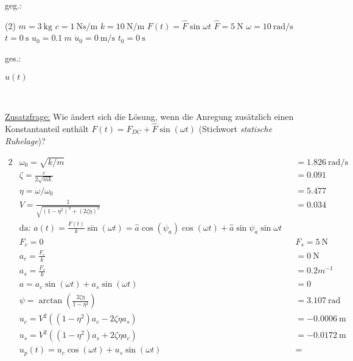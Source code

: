     


    \begin{minipage}[t]{.49\linewidth}
        geg.:
        \begin{tasks} (2)
           \task[] $m = \SI{3}{\kilo\gram}$
           \task[] $c = \SI{1}{\newton\second\per\meter}$
           \task[] $k = \SI{10}{\newton\per\meter}$
            \task[] $F(t) = \hat{F} \sin{\omega t}$
           \task[] $\hat{F} = \SI{5}{\newton}$
           \task[] $\omega = \SI{10}{\radian\per\second}$
           \task[] $t=\SI{0}{\second}$
           \task[] $u_0 = \SI{0.1}{m}$
           \task[] $\dot{u}_0 = \SI{0}{\meter\per\second}$
           \task[] $t_0 = \SI{0}{\second}$
        \end{tasks}
        \end{minipage}
        \begin{minipage}[t]{.49\linewidth}
        ges.:
        \begin{tasks}
            \task[] $u(t)$
        \end{tasks}
    \end{minipage}\\
    \vspace{1cm}

    \underline{Zusatzfrage:} Wie ändert sich die Lösung, wenn die Anregung zusätzlich einen Konstantanteil enthält $F(t) = F_{DC} +\hat{F} \sin{(\omega t)}$ (Stichwort \textit{statische Ruhelage})?

    \begin{solution}
        \begin{alignat*}{2}
            &\omega_0 = \sqrt{k/m} &&= \SI{1.826}{\radian\per\second} \\
            &\zeta = \frac{c}{2\sqrt{mk}} &&= 0.091 \\
            &\eta = \omega/\omega_0 &&= 5.477\\
            &V = \frac{1}{\sqrt{(1 - \eta^2)^2 + (2\zeta\eta)^2}} &&= 0.034\\
            &\text{da: } a(t) = \frac{F(t)}{k} \sin(\omega t) = \hat{a} \cos(\psi_a) \cos(\omega t) + \hat{a} \sin{\psi_a} \sin{\omega t} \\
            &F_c = 0 && F_s = \SI{5}{\newton} \\
            &a_c = \frac{F_c}{k} &&= \SI{0}{\newton}\\ 
            &a_s = \frac{F_s}{k} &&= 0.2 m^{-1} \\
            &a= a_c \sin(\omega t) + a_s \sin(\omega t) &&= 0 \\
            &\psi = \arctan(\frac{2\zeta \eta}{1-\eta^2}) &&= \SI{3.107}{\radian}\\
            &u_c = V^2((1-\eta^2)a_c - 2 \zeta \eta a_s) &&= \SI{-0.0006}{\meter}\\
            &u_s = V^2((1 - \eta^2)a_s + 2 \zeta \eta a_c) &&= \SI{-0.0172}{\meter}\\
            &u_p(t)= u_c \cos(\omega t) + u_s \sin(\omega t) &&= \\
        \end{alignat*}
    \end{solution}
        
